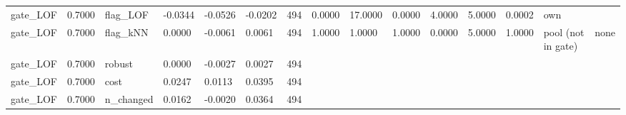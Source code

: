 \begin{table}[t]
\begin{tabular}{lllllllllllllll}
gate\_LOF & 0.7000 & flag\_LOF & -0.0344 & -0.0526 & -0.0202 & 494 & 0.0000 & 17.0000 & 0.0000 & 4.0000 & 5.0000 & 0.0002 & own &  \\
gate\_LOF & 0.7000 & flag\_kNN & 0.0000 & -0.0061 & 0.0061 & 494 & 1.0000 & 1.0000 & 1.0000 & 0.0000 & 5.0000 & 1.0000 & pool (not in gate) & none \\
gate\_LOF & 0.7000 & robust & 0.0000 & -0.0027 & 0.0027 & 494 &  &  &  &  &  &  &  &  \\
gate\_LOF & 0.7000 & cost & 0.0247 & 0.0113 & 0.0395 & 494 &  &  &  &  &  &  &  &  \\
gate\_LOF & 0.7000 & n\_changed & 0.0162 & -0.0020 & 0.0364 & 494 &  &  &  &  &  &  &  &  \\
\bottomrule
\end{tabular}
\end{table}
